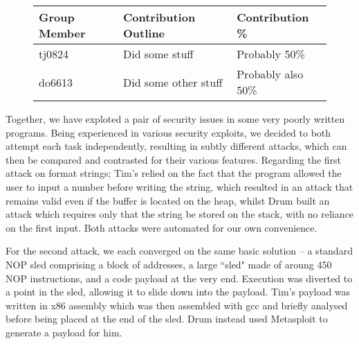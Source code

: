 \begin{figure}[h]
\centering
\begin{tabular}{|l|l|l|}
\hline
{\bf Group Member} & {\bf Contribution Outline} & {\bf Contribution \%} \\
\hline
tj0824 & Did some stuff & Probably 50\% \\
do6613 & Did some other stuff & Probably also 50\% \\
\hline
\end{tabular}
\end{figure}

Together, we have exploted a pair of security issues in some very poorly written programs. Being experienced in various security exploits, we decided to both attempt each task independently, resulting in subtly different attacks, which can then be compared and contrasted for their various features. Regarding the first attack on format strings; Tim's relied on the fact that the program allowed the user to input a number before writing the string, which resulted in an attack that remains valid even if the buffer is located on the heap, whilst Drum built an attack which requires only that the string be stored on the stack, with no reliance on the first input. Both attacks were automated for our own convenience.

For the second attack, we each converged on the same basic solution -- a standard NOP sled comprising a block of addresses, a large ``sled" made of aroung 450 NOP instructions, and a code payload at the very end. Execution was diverted to a point in the sled, allowing it to slide down into the payload. Tim's payload was written in x86 assembly which was then assembled with gcc and briefly analysed before being placed at the end of the sled. Drum instead used Metasploit to generate a payload for him.